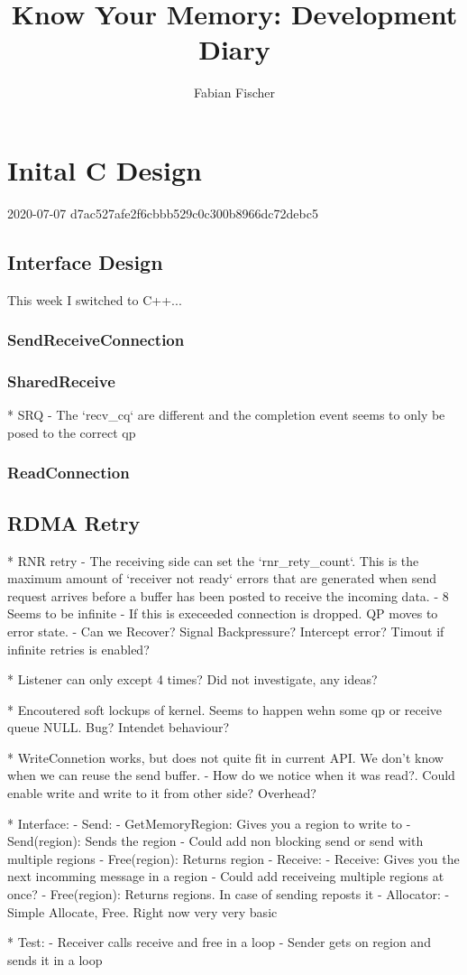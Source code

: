 \documentclass[a4paper,twoside]{article} %
\title{Know Your Memory: Development Diary}
\author{Fabian Fischer}
\newcommand{\entry}[3]{\section*{#3}#1  #2}
\begin{document}


\entry{2020-07-07}{d7ac527afe2f6cbbb529c0c300b8966dc72debc5}{Inital C Design}

\subsection*{Interface Design}
This week I switched to C++...

\subsubsection*{SendReceiveConnection}
\subsubsection*{SharedReceive}


* SRQ
  - The `recv\_cq` are different and the completion event seems to only be posed to the correct qp
\subsubsection*{ReadConnection}

\subsection{RDMA Retry}
* RNR retry
  - The receiving side can set the `rnr\_rety\_count`. This is the maximum amount of `receiver not ready` errors that are generated
when send request arrives before a buffer has been posted to receive the incoming data. 
  - 8 Seems to be infinite
  - If this is execeeded connection is dropped. QP moves to error state.
  - Can we Recover? Signal Backpressure? Intercept error? Timout if infinite retries is enabled?



* Listener can only except 4 times? Did not investigate, any ideas?

* Encoutered soft lockups of kernel. Seems to happen wehn some qp or receive queue NULL. Bug? Intendet behaviour?

* WriteConnetion works, but does not quite fit in current API. We don't know when we can reuse the send buffer. 
  - How do we notice when it was read?. Could enable write and write to it from other side? Overhead?

* Interface:
  - Send:
    - GetMemoryRegion: Gives you a region to write to
    - Send(region): Sends the region
      - Could add non blocking send or send with multiple regions
    - Free(region): Returns region
  - Receive:
    - Receive: Gives you the next incomming message in a region
      - Could add receiveing multiple regions at once?
    - Free(region): Returns regions. In case of sending reposts it
  - Allocator:
    - Simple Allocate, Free. Right now very very basic

* Test:
  - Receiver calls receive and free in a loop
  - Sender gets on region and sends it in a loop
\end{document}

